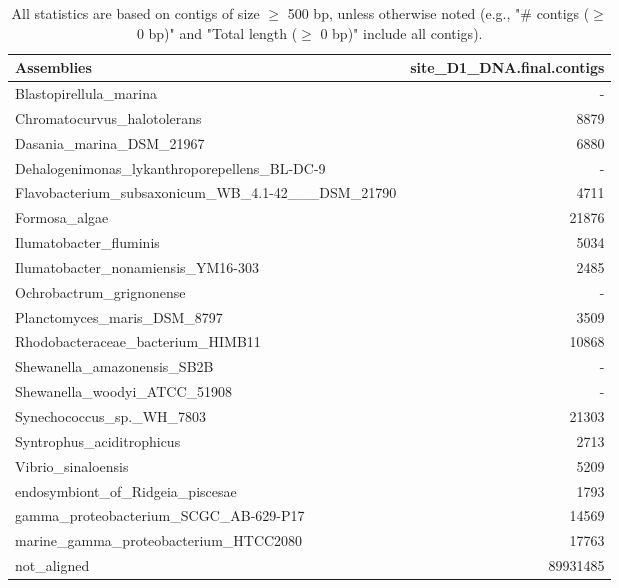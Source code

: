 \documentclass[12pt,a4paper]{article}
\begin{document}
\begin{table}[ht]
\begin{center}
\caption{All statistics are based on contigs of size $\geq$ 500 bp, unless otherwise noted (e.g., "\# contigs ($\geq$ 0 bp)" and "Total length ($\geq$ 0 bp)" include all contigs).}
\begin{tabular}{|l*{1}{|r}|}
\hline
Assemblies & site\_D1\_DNA.final.contigs \\ \hline
Blastopirellula\_marina & - \\ \hline
Chromatocurvus\_halotolerans & 8879 \\ \hline
Dasania\_marina\_DSM\_21967 & 6880 \\ \hline
Dehalogenimonas\_lykanthroporepellens\_BL-DC-9 & - \\ \hline
Flavobacterium\_subsaxonicum\_WB\_4.1-42\_\_\_DSM\_21790 & 4711 \\ \hline
Formosa\_algae & 21876 \\ \hline
Ilumatobacter\_fluminis & 5034 \\ \hline
Ilumatobacter\_nonamiensis\_YM16-303 & 2485 \\ \hline
Ochrobactrum\_grignonense & - \\ \hline
Planctomyces\_maris\_DSM\_8797 & 3509 \\ \hline
Rhodobacteraceae\_bacterium\_HIMB11 & 10868 \\ \hline
Shewanella\_amazonensis\_SB2B & - \\ \hline
Shewanella\_woodyi\_ATCC\_51908 & - \\ \hline
Synechococcus\_sp.\_WH\_7803 & 21303 \\ \hline
Syntrophus\_aciditrophicus & 2713 \\ \hline
Vibrio\_sinaloensis & 5209 \\ \hline
endosymbiont\_of\_Ridgeia\_piscesae & 1793 \\ \hline
gamma\_proteobacterium\_SCGC\_AB-629-P17 & 14569 \\ \hline
marine\_gamma\_proteobacterium\_HTCC2080 & 17763 \\ \hline
not\_aligned & 89931485 \\ \hline
\end{tabular}
\end{center}
\end{table}
\end{document}
